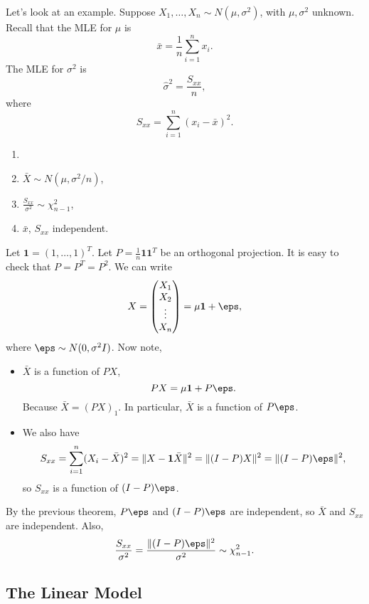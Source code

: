 \documentclass[12pt]{article}
\begin{document}
Let's look at an example. Suppose $X_1, \ldots, X_n \sim N(\mu, \sigma^2)$, with $\mu, \sigma^2$ unknown. Recall that the MLE for $\mu$ is
\[
\bar x = \frac{1}{n} \sum_{i = 1}^{n} x_i.
\]
The MLE for $\sigma^2$ is
\[
\hat \sigma^2 = \frac{S_{xx}}{n},
\]
where
\[
S_{xx} = \sum_{i = 1}^{n} (x_i - \bar x)^2.
\]
\begin{theorem}
	\begin{enumerate}[\normalfont(i)]
		\item[]
		\item $\bar X \sim N(\mu, \sigma^2/n)$,
		\item $\frac{S_{xx}}{\sigma^2} \sim \chi_{n-1}^2$,
		\item $\bar x$, $S_{xx}$ independent.
	\end{enumerate}
\end{theorem}

\begin{proofbox}
	Let $\mathbf{1} = (1, \ldots, 1)^{T}$. Let $P= \frac{1}{n} \mathbf{1} \mathbf{1}^{T}$ be an orthogonal projection. It is easy to check that $P = P^{T} = P^2$. We can write
	\[
	X =
	\begin{pmatrix}
		X_1 \\ X_2 \\ \vdots \\ X_n
	\end{pmatrix}
	 = \mu \mathbf{1} + \eps,
	\]
	where $\eps \sim N(0, \sigma^2 I)$. Now note,
	\begin{itemize}
		\item $\bar X$ is a function of $PX$,
			\[
			PX = \mu \mathbf{1} + P\eps.
			\]
			Because $\bar X = (PX)_1$. In particular, $\bar X$ is a function of $P\eps$.
		\item We also have
			\[
			S_{x x} = \sum_{i = 1}^{n} (X_i - \bar X)^2 = \|X - \mathbf{1}\bar X \|^2 = \|(I-P)X\|^2 = \|(I-P)\eps\|^2,
			\]
			so $S_{x x}$ is a function of $(I-P)\eps$.
	\end{itemize}
	By the previous theorem, $P\eps$ and $(I-P)\eps$ are independent, so $\bar X$ and $S_{xx}$ are independent. Also,
	\[
	\frac{S_{x x}}{\sigma^2} = \frac{\|(I-P)\eps\|^2}{\sigma^2} \sim \chi_{n-1}^2.
	\]
\end{proofbox}


\subsection{The Linear Model}
\label{sub:the_linear_model}
\end{document}
